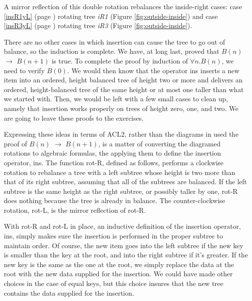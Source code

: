 A mirror reflection of this double rotation rebalances
the inside-right cases:
case \ref{insR1yL} (page \pageref{out-of-balance-cases})
rotating tree \emph{iR1} (Figure \ref{fig:outside-inside})
and
case \ref{insR3yL} (page \pageref{out-of-balance-cases})
rotating tree \emph{iR3} (Figure \ref{fig:outside-inside}).

There are no other cases in which insertion
can cause the tree to go out of balance,
so the induction is complete.
We have, at long last, proved that $B(n)$ $\rightarrow$ $B(n+1)$ is true.
To complete the proof by induction of $\forall n.B(n)$,
we need to verify $B(0)$.
We would then know that
the operator ins
inserts a new item into an ordered, height balanced tree
of height two or more and
delivers an ordered, height-balanced tree of the same height
or at most one taller than what we started with.
Then, we would be left with a few small cases to clean up,
namely that insertion works properly on trees of height zero, one, and two.
We are going to leave these proofs to the exercises.

Expressing these ideas in terms of ACL2, rather than the
diagrams in used the proof of $B(n)$ $\rightarrow$ $B(n+1)$,
is a matter of converting the diagramed rotations to algebraic formulas,
the applying them to define the insertion operator, ins.
The function rot-R, defined as follows, performs a clockwise
rotation to rebalance a tree with a left subtree whose height is two more
than that of its right subtree, assuming that all of the subtrees are balanced.
If the left subtree is the same height as the right subtree,
or possibly taller by one, rot-R does nothing because the tree is already in balance.
The counter-clockwise rotation, rot-L, is the mirror reflection of rot-R.

With rot-R and rot-L in place, an inductive definition of the insertion
operator, ins, simply makes sure the insertion is performed in the proper
subtree to maintain order.
Of course, the new item goes into the left subtree
if the new key is smaller than the key
at the root, and into the right subtree if it's greater.
If the new key is the same as the one at the root,
we simply replace the data at the root with the new data
supplied for the insertion.
We could have made other choices in the case of equal keys,
but this choice insures that the new tree contains
the data supplied for the insertion.

